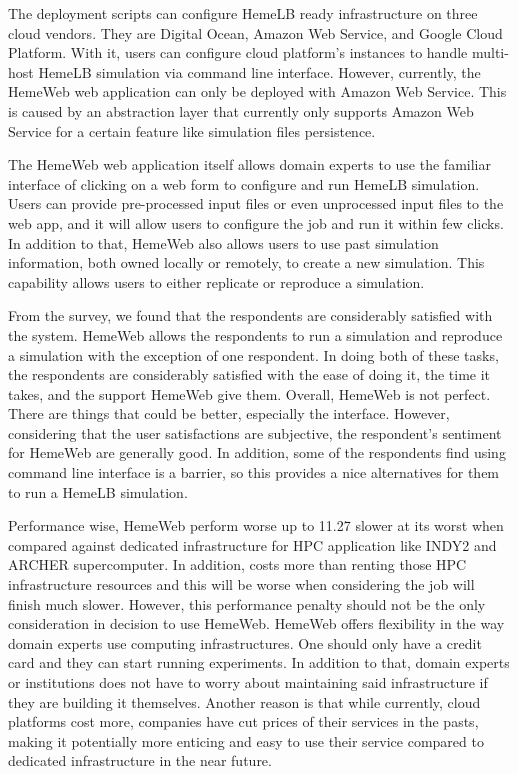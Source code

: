 The deployment scripts can configure HemeLB ready infrastructure on three cloud vendors. They are Digital Ocean, Amazon Web Service, and Google Cloud Platform. With it, users can configure cloud platform's instances to handle multi-host HemeLB simulation via command line interface. However, currently, the HemeWeb web application can only be deployed with Amazon Web Service. This is caused by an abstraction layer that currently only supports Amazon Web Service for a certain feature like simulation files persistence.

The HemeWeb web application itself allows domain experts to use the familiar interface of clicking on a web form to configure and run HemeLB simulation. Users can provide pre-processed input files or even unprocessed input files to the web app, and it will allow users to configure the job and run it within few clicks. In addition to that, HemeWeb also allows users to use past simulation information, both owned locally or remotely, to create a new simulation. This capability allows users to either replicate or reproduce a simulation.

From the survey, we found  that the respondents are considerably satisfied with the system. HemeWeb allows the respondents to run a simulation and reproduce a simulation with the exception of one respondent. In doing both of these tasks, the respondents are considerably satisfied with the ease of doing it, the time it takes, and the support HemeWeb give them. Overall, HemeWeb is not perfect. There are things that could be better, especially the interface. However, considering that the user satisfactions are subjective, the respondent's sentiment for HemeWeb are generally good. In addition, some of the respondents find using command line interface is a barrier, so this provides a nice alternatives for them to run a HemeLB simulation.

Performance wise, HemeWeb perform worse up to 11.27 slower at its worst when compared against dedicated infrastructure for HPC application like INDY2 and ARCHER supercomputer. In addition, costs more than renting those HPC infrastructure resources and this will be worse when considering the job will finish much slower. However, this performance penalty should not be the only consideration in decision to use HemeWeb. HemeWeb offers flexibility in the way domain experts use computing infrastructures. One should only have a credit card and they can start running experiments. In addition to that, domain experts or institutions does not have to worry about maintaining said infrastructure if they are building it themselves. Another reason is that while currently, cloud platforms cost more, companies have cut prices of their services in the pasts\citep{AWSPr74:online, Annou90:online, Googl18:online}, making it potentially more enticing and easy to use their service compared to dedicated infrastructure in the near future.



